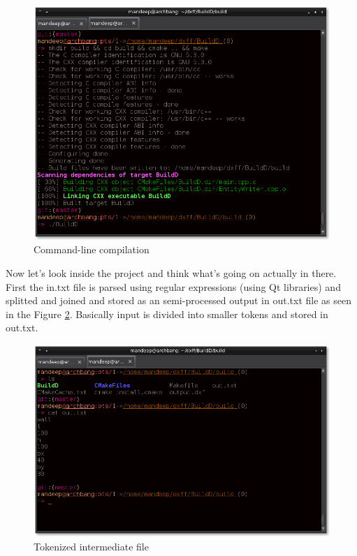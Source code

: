 \begin{figure}
	\centering
	\includegraphics[scale=0.49]{images/bld3.png}
	\caption{Command-line compilation}
	\label{fig:compile}
\end{figure}

\noindent Now let's look inside the project and think what's going on actually in there. First the in.txt file is parsed using regular expressions (using Qt libraries) and splitted and joined and stored as an semi-processed output in out.txt file as seen in the Figure \ref{fig:token}. Basically input is divided into smaller tokens and stored in out.txt.\\

\begin{figure}
\centering
\includegraphics[scale=0.5]{images/bld1.png}
\caption{Tokenized intermediate file}
\label{fig:token}
\end{figure}

